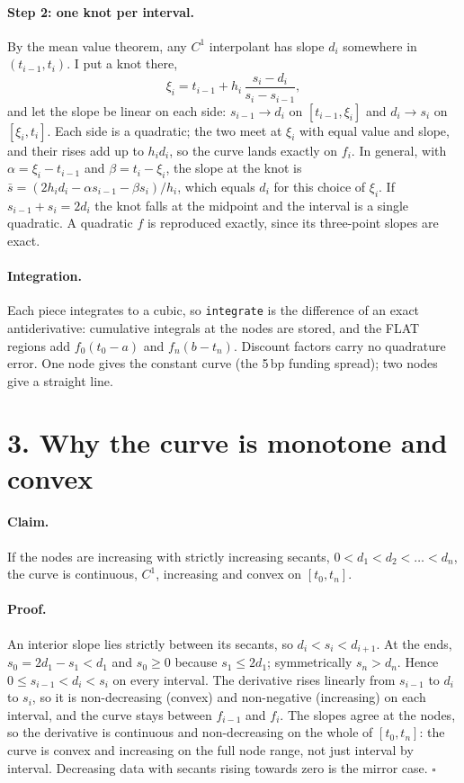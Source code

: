 \documentclass[11pt]{article}
\begin{document}
\paragraph{Step 2: one knot per interval.} By the mean value theorem, any $C^1$ interpolant has slope $d_i$ somewhere in $(t_{i-1},t_i)$. I put a knot there,
\[
\xi_i=t_{i-1}+h_i\,\frac{s_i-d_i}{s_i-s_{i-1}},
\]
and let the slope be linear on each side: $s_{i-1}\to d_i$ on $[t_{i-1},\xi_i]$ and $d_i\to s_i$ on $[\xi_i,t_i]$. Each side is a quadratic; the two meet at $\xi_i$ with equal value and slope, and their rises add up to $h_i d_i$, so the curve lands exactly on $f_i$. In general, with $\alpha=\xi_i-t_{i-1}$ and $\beta=t_i-\xi_i$, the slope at the knot is $\bar s=(2h_i d_i-\alpha s_{i-1}-\beta s_i)/h_i$, which equals $d_i$ for this choice of $\xi_i$. If $s_{i-1}+s_i=2d_i$ the knot falls at the midpoint and the interval is a single quadratic. A quadratic $f$ is reproduced exactly, since its three-point slopes are exact.

\paragraph{Integration.} Each piece integrates to a cubic, so \texttt{integrate} is the difference of an exact antiderivative: cumulative integrals at the nodes are stored, and the FLAT regions add $f_0(t_0-a)$ and $f_n(b-t_n)$. Discount factors carry no quadrature error. One node gives the constant curve (the 5\,bp funding spread); two nodes give a straight line.

\section*{3. Why the curve is monotone and convex}

\paragraph{Claim.} If the nodes are increasing with strictly increasing secants, $0<d_1<d_2<\dots<d_n$, the curve is continuous, $C^1$, increasing and convex on $[t_0,t_n]$.

\paragraph{Proof.} An interior slope lies strictly between its secants, so $d_i<s_i<d_{i+1}$. At the ends, $s_0=2d_1-s_1<d_1$ and $s_0\ge 0$ because $s_1\le 2d_1$; symmetrically $s_n>d_n$. Hence $0\le s_{i-1}<d_i<s_i$ on every interval. The derivative rises linearly from $s_{i-1}$ to $d_i$ to $s_i$, so it is non-decreasing (convex) and non-negative (increasing) on each interval, and the curve stays between $f_{i-1}$ and $f_i$. The slopes agree at the nodes, so the derivative is continuous and non-decreasing on the whole of $[t_0,t_n]$: the curve is convex and increasing on the full node range, not just interval by interval. Decreasing data with secants rising towards zero is the mirror case. \hfill$\square$
\end{document}
